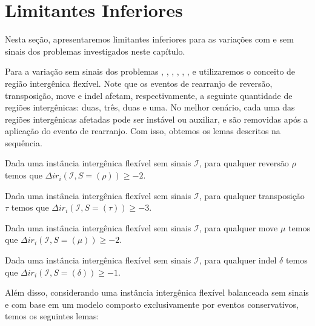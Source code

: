 \section{Limitantes Inferiores}

Nesta seção, apresentaremos limitantes inferiores para as variações com e sem sinais dos problemas investigados neste capítulo.

Para a variação sem sinais dos problemas \SbFIR{}, \SbFIRI{}, \SbFIRM{}, \SbFIRMI{}, \SbFIRT{}, \SbFIRTI{}, \SbFIRTM{} e  \SbFIRTMI{} utilizaremos o conceito de região intergênica flexível. Note que os eventos de rearranjo de reversão, transposição, move e indel afetam, respectivamente, a seguinte quantidade de regiões intergênicas: duas, três, duas e uma. No melhor cenário, cada uma das regiões intergênicas afetadas pode ser instável ou auxiliar, e são removidas após a aplicação do evento de rearranjo. Com isso, obtemos os lemas descritos na sequência.

\begin{lemma}\label{lemma:VJKGLBQG}
Dada uma instância intergênica flexível sem sinais $\mathcal{I}$, para qualquer reversão $\rho$ temos que $\Delta ir_i(\mathcal{I}, S = (\rho)) \ge -2$.
\end{lemma}

\begin{lemma}\label{lemma:XLUTQDGV}
Dada uma instância intergênica flexível sem sinais $\mathcal{I}$, para qualquer transposição $\tau$ temos que $\Delta ir_i(\mathcal{I}, S = (\tau)) \ge -3$.
\end{lemma}

\begin{lemma}\label{lemma:ZOCGWWGV}
Dada uma instância intergênica flexível sem sinais $\mathcal{I}$, para qualquer move $\mu$ temos que $\Delta ir_i(\mathcal{I}, S = (\mu)) \ge -2$.
\end{lemma}

\begin{lemma}\label{lemma:HQJMMZCU}
Dada uma instância intergênica flexível sem sinais $\mathcal{I}$, para qualquer indel $\delta$ temos que $\Delta ir_i(\mathcal{I}, S = (\delta)) \ge -1$.
\end{lemma}

Além disso, considerando uma instância intergênica flexível balanceada sem sinais e com base em um modelo composto exclusivamente por eventos conservativos, temos os seguintes lemas:

